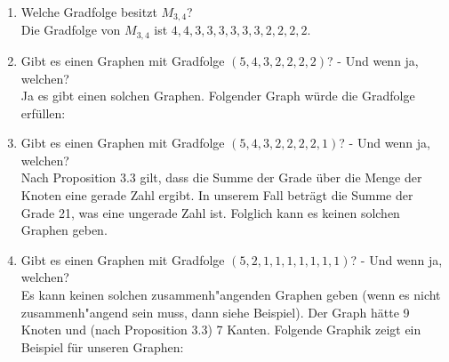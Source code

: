     \begin{enumerate}[label=(\alph*)]
        \item Welche Gradfolge besitzt $M_{3,4}$?\\
        Die Gradfolge von $M_{3,4}$ ist $4,4,3,3,3,3,3,3,2,2,2,2$.

        \item Gibt es einen Graphen mit Gradfolge $(5, 4, 3, 2, 2, 2, 2)$? - Und wenn ja, welchen?\\
        Ja es gibt einen solchen Graphen. Folgender Graph würde die Gradfolge erfüllen: \\

        \item Gibt es einen Graphen mit Gradfolge $(5, 4, 3, 2, 2, 2, 2, 1)$? - Und wenn ja, welchen?\\
        Nach Proposition 3.3 gilt, dass die Summe der Grade über die Menge der Knoten eine gerade Zahl ergibt. 
        In unserem Fall beträgt die Summe der Grade 21, was eine ungerade Zahl ist. Folglich kann es 
        keinen solchen Graphen geben. 

        \item Gibt es einen Graphen mit Gradfolge $(5, 2, 1, 1, 1, 1, 1, 1, 1)$? - Und wenn ja, welchen?\\
        Es kann keinen solchen zusammenh"angenden Graphen geben (wenn es nicht zusammenh"angend sein muss, 
        dann siehe Beispiel). Der Graph hätte 9 Knoten und (nach Proposition 3.3) 7 Kanten. 
        Folgende Graphik zeigt ein Beispiel für unseren Graphen: \\\\
\end{enumerate}
